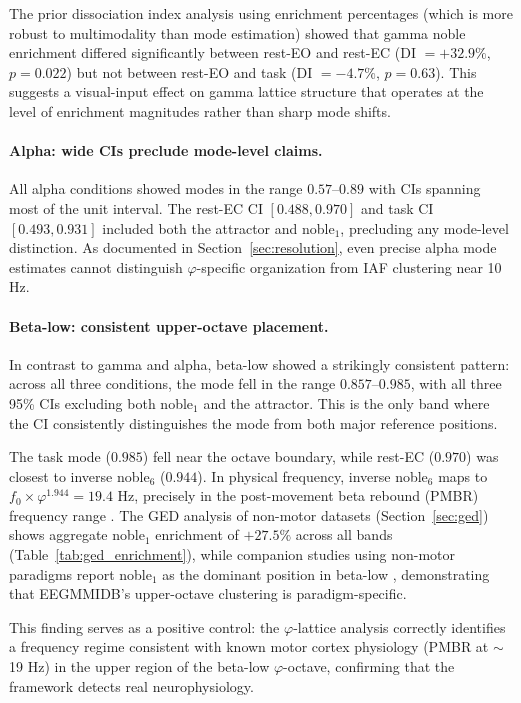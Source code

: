 \documentclass[11pt,a4paper]{article}
\newcommand{\phisym}{\varphi}
\newcommand{\fzero}{f_0}
\begin{document}
The prior dissociation index analysis using enrichment percentages (which is more robust to multimodality than mode estimation) showed that gamma noble enrichment differed significantly between rest-EO and rest-EC (DI $= +32.9\%$, $p = 0.022$) but not between rest-EO and task (DI $= -4.7\%$, $p = 0.63$). This suggests a visual-input effect on gamma lattice structure that operates at the level of enrichment magnitudes rather than sharp mode shifts.

\paragraph{Alpha: wide CIs preclude mode-level claims.}
All alpha conditions showed modes in the range $0.57$--$0.89$ with CIs spanning most of the unit interval. The rest-EC CI $[0.488, 0.970]$ and task CI $[0.493, 0.931]$ included both the attractor and noble$_1$, precluding any mode-level distinction. As documented in Section~\ref{sec:resolution}, even precise alpha mode estimates cannot distinguish $\phisym$-specific organization from IAF clustering near 10 Hz.

\paragraph{Beta-low: consistent upper-octave placement.}
In contrast to gamma and alpha, beta-low showed a strikingly consistent pattern: across all three conditions, the mode fell in the range $0.857$--$0.985$, with all three 95\% CIs excluding both noble$_1$ and the attractor. This is the only band where the CI consistently distinguishes the mode from both major reference positions.

The task mode ($0.985$) fell near the octave boundary, while rest-EC ($0.970$) was closest to inverse noble$_6$ ($0.944$). In physical frequency, inverse noble$_6$ maps to $\fzero \times \phisym^{1.944} = 19.4$ Hz, precisely in the post-movement beta rebound (PMBR) frequency range \parencite{pfurtscheller1999event, jurkiewicz2006pmbr}. The GED analysis of non-motor datasets (Section~\ref{sec:ged}) shows aggregate noble$_1$ enrichment of $+27.5\%$ across all bands (Table~\ref{tab:ged_enrichment}), while companion studies using non-motor paradigms report noble$_1$ as the dominant position in beta-low \parencite{lacy2026golden}, demonstrating that EEGMMIDB's upper-octave clustering is paradigm-specific.

This finding serves as a positive control: the $\phisym$-lattice analysis correctly identifies a frequency regime consistent with known motor cortex physiology (PMBR at $\sim$19 Hz) in the upper region of the beta-low $\phisym$-octave, confirming that the framework detects real neurophysiology.
\end{document}
